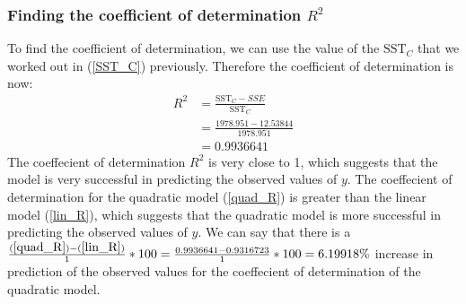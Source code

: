\documentclass[12pt]{article}
\begin{document}
\subsubsection{Finding the coefficient of determination $R^2$}
To find the coefficient of determination, we can use the value of the $\text{SST}_C$ that we worked out in (\ref{SST_C}) previously. Therefore the coefficient of determination is now:
\begin{align}
      R^2 & = \frac{\text{SST}_C - SSE}{\text{SST}_C} \nonumber \\
          & = \frac{1978.951 - 12.53844}{1978.951} \nonumber \\
          & = 0.9936641 \label{quad_R}
\end{align}
The coeffecient of determination $R^2$ is very close to 1, which suggests that the model is very successful in predicting the observed values of $y$. The coeffecient of determination for the quadratic model (\ref{quad_R}) is greater than the linear model (\ref{lin_R}), which suggests that the quadratic model is more successful in predicting the observed values of $y$. We can say that there is a $\frac{(\ref{quad_R})-(\ref{lin_R})}{1}*100=\frac{0.9936641-0.9316723}{1}*100=6.19918\%$ increase in prediction of the observed values for the coeffecient of determination of the quadratic model.
\end{document}
